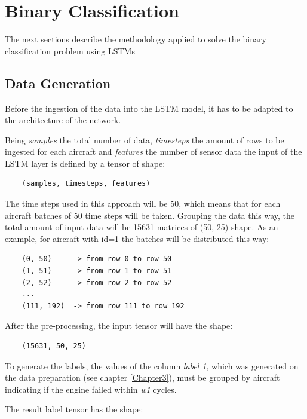 \section{Binary Classification}

The next sections describe the methodology applied to solve the binary classification problem using LSTMs

\subsection{Data Generation}

Before the ingestion of the data into the LSTM model, it has to be adapted to the architecture of the network.

Being \textit{samples} the total number of data, \textit{timesteps} the amount of rows to be ingested for each aircraft and \textit{features} the number of sensor data the input of the LSTM layer is defined by a tensor of shape:

\begin{verbatim}
    (samples, timesteps, features)
\end{verbatim}

The time steps used in this approach will be 50, which means that for each aircraft batches of 50 time steps will be taken.
Grouping the data this way, the total amount of input data will be 15631 matrices of (50, 25) shape.
As an example, for aircraft with id=1 the batches will be distributed this way:

\begin{verbatim}
    (0, 50)     -> from row 0 to row 50
    (1, 51)     -> from row 1 to row 51
    (2, 52)     -> from row 2 to row 52
    ...
    (111, 192)  -> from row 111 to row 192
\end{verbatim}

After the pre-processing, the input tensor will have the shape:

\begin{verbatim}
    (15631, 50, 25)
\end{verbatim}

To generate the labels, the values of the column \textit{label 1}, which was generated on the data preparation (see chapter \ref{Chapter3}), must be grouped by aircraft indicating if the engine failed within \textit{w1} cycles.

The result label tensor has the shape:

